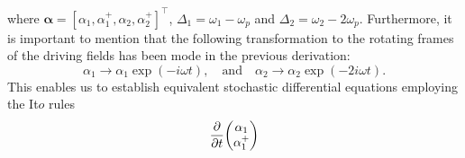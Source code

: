 \documentclass[fleqn,11pt]{wlscirep}
\begin{document}
where $\boldsymbol{\alpha} = [{\alpha}_1,{\alpha}_1^{+},{\alpha}_2,{\alpha}_2^{+}]^{\intercal}$, $\Delta_1 = \omega_1 - \omega_p$ and $\Delta_2 = \omega_2 - 2\omega_p$. Furthermore, it is important to mention that the following transformation to the rotating frames of the driving fields has been mode in the previous derivation:
\begin{equation}
	\alpha_1 \rightarrow \alpha_1\exp(-i\omega t), \quad \text{and} \quad
	\alpha_2 \rightarrow \alpha_2\exp(-2i\omega t).
\end{equation}
This enables us to establish equivalent stochastic differential equations employing the It$\hat{o}$ rules
\begin{equation}
	\pdv{t}\mqty(\alpha_1 \\ \alpha_1^+)
\end{equation}



































\end{document}
